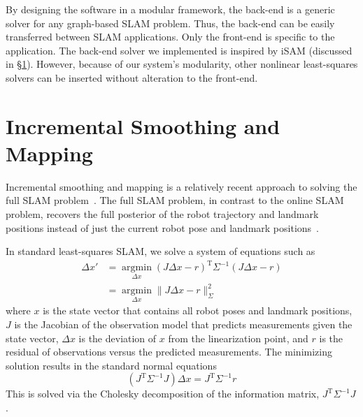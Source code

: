 \documentclass[conference]{IEEEtran}
\begin{document}
By designing the software in a modular framework, the back-end is a generic solver for any
graph-based \ac{SLAM} problem. Thus, the back-end can be easily transferred between
\ac{SLAM} applications. Only the front-end is specific to the application. The back-end
solver we implemented is inspired by iSAM (discussed in
\S\ref{sec:incrementalsmoothingandmapping}). However, because of our system's modularity,
other nonlinear least-squares solvers can be inserted without alteration to the front-end.

\section{Incremental Smoothing and Mapping}
\label{sec:incrementalsmoothingandmapping}


Incremental smoothing and mapping is a relatively recent approach to solving the
full \ac{SLAM} problem~\cite{Kaess08tro}.  The full \ac{SLAM} problem, in contrast to the
online \ac{SLAM} problem, recovers the full posterior of the robot trajectory and landmark
positions instead of just the current robot pose and landmark
positions~\cite{thrun2005probabilistic}.

In standard least-squares \ac{SLAM}, we solve a system of equations such as
\begin{align*}
  \Delta x' &= \underset{\Delta x}{\operatorname{argmin}} (J\Delta x - r)^{\text{T}}
\Sigma^{-1} (J\Delta x - r) \\
  &= \underset{\Delta x}{\operatorname{argmin}} \| J\Delta x - r \|^2_{\Sigma}
\end{align*}
where $x$ is the state vector that contains all robot poses and
landmark positions, $J$ is the Jacobian of the observation model that
predicts measurements given the state vector, $\Delta x$ is the
deviation of $x$ from the linearization point, and $r$ is the residual
of observations versus the predicted measurements. The minimizing
solution results in the standard normal equations
\[
(J^{\text{T}} \Sigma^{-1} J) \Delta x = J^{\text{T}} \Sigma^{-1}r
\]
This is solved via the Cholesky decomposition of the information matrix,
$J^{\text{T}}\Sigma^{-1}J$.
\end{document}
